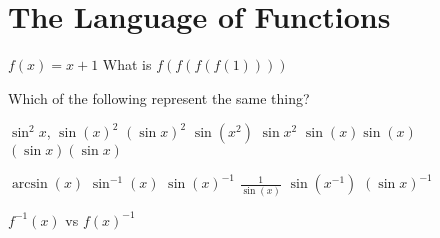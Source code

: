 \section{The Language of Functions}



$f(x) = x+1$ What is $f(f(f(f(1))))$



Which of the following represent the same thing?

$\sin^2 x$, $\sin(x)^2$  $(\sin x)^2$ $\sin(x^2)$ $\sin x^2$ $\sin(x) \sin(x)$ $(\sin x)(\sin x)$


$\arcsin(x)$ $\sin^{-1}(x)$ $\sin(x)^{-1}$ $\frac{1}{\sin(x)}$ $\sin(x^{-1})$  $(\sin x)^{-1}$


$f^{-1}(x)$ vs $f(x)^{-1}$
